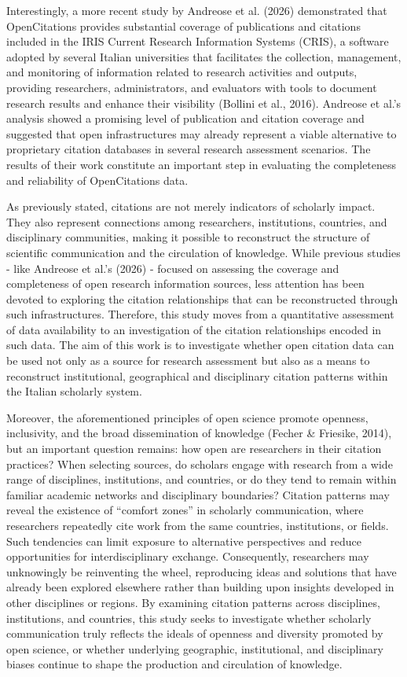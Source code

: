 \documentclass[year=2026]{cup-journal}
\begin{document}
Interestingly, a more recent study by Andreose et al. (2026) demonstrated that OpenCitations provides substantial coverage of publications and citations included in the IRIS Current Research Information Systems (CRIS), a software adopted by several Italian universities that facilitates the collection, management, and monitoring of information related to research activities and outputs, providing researchers, administrators, and evaluators with tools to document research results and enhance their visibility (Bollini et al., 2016). Andreose et al.’s  analysis showed a promising level of publication and citation coverage and suggested that open infrastructures may already represent a viable alternative to proprietary citation databases in several research assessment scenarios. The results of their work constitute an important step in evaluating the completeness and reliability of OpenCitations data. 

As previously stated, citations are not merely indicators of scholarly impact. They also represent connections among researchers, institutions, countries, and disciplinary communities, making it possible to reconstruct the structure of scientific communication and the circulation of knowledge. While previous studies - like Andreose et al.’s (2026) - focused on assessing the coverage and completeness of open research information sources, less attention has been devoted to exploring the citation relationships that can be reconstructed through such infrastructures. Therefore, this study moves from a quantitative assessment of data availability to an investigation of the citation relationships encoded in such data. The aim of this work is to investigate whether open citation data can be used not only as a source for research assessment but also as a means to reconstruct institutional, geographical and disciplinary citation patterns within the Italian scholarly system.

Moreover, the aforementioned principles of open science promote openness, inclusivity, and the broad dissemination of knowledge (Fecher \& Friesike, 2014), but an important question remains: how open are researchers in their citation practices? When selecting sources, do scholars engage with research from a wide range of disciplines, institutions, and countries, or do they tend to remain within familiar academic networks and disciplinary boundaries? Citation patterns may reveal the existence of “comfort zones” in scholarly communication, where researchers repeatedly cite work from the same countries, institutions, or fields. Such tendencies can limit exposure to alternative perspectives and reduce opportunities for interdisciplinary exchange. Consequently, researchers may unknowingly be reinventing the wheel, reproducing ideas and solutions that have already been explored elsewhere rather than building upon insights developed in other disciplines or regions. By examining citation patterns across disciplines, institutions, and countries, this study seeks to investigate whether scholarly communication truly reflects the ideals of openness and diversity promoted by open science, or whether underlying geographic, institutional, and disciplinary biases continue to shape the production and circulation of knowledge.
\end{document}

